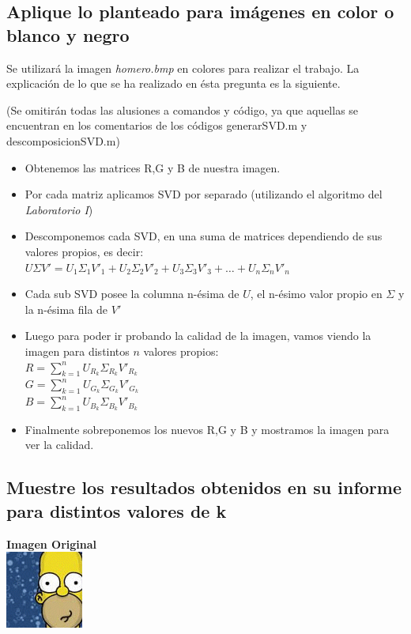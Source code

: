 \subsection{Aplique lo planteado para im\'agenes en color o blanco y negro}

Se utilizará la imagen \emph{homero.bmp} en colores para realizar el trabajo.
La explicación de lo que se ha realizado en ésta pregunta es la siguiente.

(Se omitirán todas las alusiones a comandos y código, ya que aquellas se encuentran en los comentarios de los códigos generarSVD.m y descomposicionSVD.m)

\begin{itemize}
	\item Obtenemos las matrices R,G y B de nuestra imagen.
	\item Por cada matriz aplicamos SVD por separado (utilizando el algoritmo del \emph{Laboratorio I})
	\item Descomponemos cada SVD, en una suma de matrices dependiendo de sus valores propios, es decir:\\
	$U\Sigma V' = U_1 \Sigma_1 V'_1 + U_2 \Sigma_2 V'_2 + U_3 \Sigma_3 V'_3 + \ldots + U_n \Sigma_n V'_n$
	\item Cada sub SVD posee la columna n-ésima de $U$, el n-ésimo valor propio en $\Sigma$ y la n-ésima fila de $V'$
	\item Luego para poder ir probando la calidad de la imagen,
		vamos viendo la imagen para distintos $n$ valores propios:\\
		$R = \sum_{k=1}^{n}U_{R_{k}}\Sigma_{R_{k}}V'_{R_{k}}$\\
		$G = \sum_{k=1}^{n}U_{G_{k}}\Sigma_{G_{k}}V'_{G_{k}}$\\
		$B = \sum_{k=1}^{n}U_{B_{k}}\Sigma_{B_{k}}V'_{B_{k}}$
	\item Finalmente sobreponemos los nuevos R,G y B y mostramos la imagen para ver la calidad.

\end{itemize}
\newpage

\subsection{Muestre los resultados obtenidos en su informe para distintos valores de k}
\begin{center}
	\textbf{Imagen Original}\\
	\includegraphics{img/homero}\\
\end{center}

